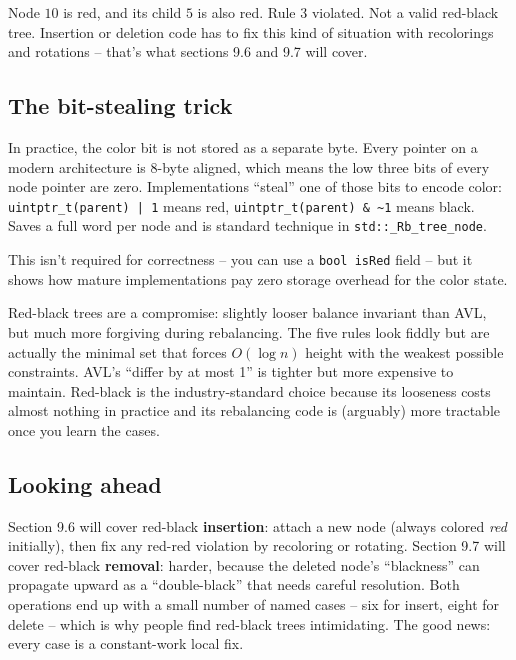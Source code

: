 \documentclass[11pt]{article}
\begin{document}
Node $10$ is red, and its child $5$ is also red. Rule 3 violated. Not a valid red-black tree. Insertion or deletion code has to fix this kind of situation with recolorings and rotations -- that's what sections 9.6 and 9.7 will cover.

\subsection*{The bit-stealing trick}

In practice, the color bit is not stored as a separate byte. Every pointer on a modern architecture is 8-byte aligned, which means the low three bits of every node pointer are zero. Implementations ``steal'' one of those bits to encode color: \texttt{uintptr\_t(parent) | 1} means red, \texttt{uintptr\_t(parent) \& \textasciitilde 1} means black. Saves a full word per node and is standard technique in \texttt{std::\_Rb\_tree\_node}.

This isn't required for correctness -- you can use a \texttt{bool isRed} field -- but it shows how mature implementations pay zero storage overhead for the color state.

\begin{ideabox}
Red-black trees are a compromise: slightly looser balance invariant than AVL, but much more forgiving during rebalancing. The five rules look fiddly but are actually the minimal set that forces $O(\log n)$ height with the weakest possible constraints. AVL's ``differ by at most 1'' is tighter but more expensive to maintain. Red-black is the industry-standard choice because its looseness costs almost nothing in practice and its rebalancing code is (arguably) more tractable once you learn the cases.
\end{ideabox}

\subsection*{Looking ahead}

Section 9.6 will cover red-black \textbf{insertion}: attach a new node (always colored \emph{red} initially), then fix any red-red violation by recoloring or rotating. Section 9.7 will cover red-black \textbf{removal}: harder, because the deleted node's ``blackness'' can propagate upward as a ``double-black'' that needs careful resolution. Both operations end up with a small number of named cases -- six for insert, eight for delete -- which is why people find red-black trees intimidating. The good news: every case is a constant-work local fix.
\end{document}
